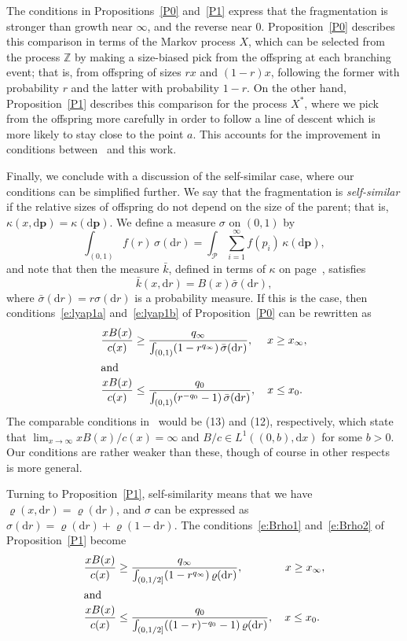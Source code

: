 \documentclass[11pt]{article}
\theoremstyle{definition}
\providecommand{\mathof}[1]{\mathrm{#1}}
\numberwithin{equation}{section}
\numberwithin{figure}{section}
\numberwithin{table}{section}
\newcommand\Pp{\mathcal{P}}
\newcommand\pp{\mathbf{p}}
\newcommand\dd{\mathof{d}}
\begin{document}
The conditions in Propositions~\ref{P0} and~\ref{P1} express that the fragmentation is stronger than growth near $\infty$, and the reverse near $0$. Proposition~\ref{P0} describes this comparison in terms of the Markov process $X$, which can be selected from the process $\mathbb{Z}$ by making a size-biased pick from the offspring at each branching event; that is, from offspring of sizes $rx$ and $(1-r)x$, following the former with probability $r$ and the latter with probability $1-r$. On the other hand, Proposition~\ref{P1} describes this comparison for the process $X^*$, where we pick from the offspring more carefully in order to follow a line of descent which is more likely to stay close to the point $a$. This accounts for the improvement in conditions between~\cite{BeFK} and this work.

Finally, we conclude with a discussion of the self-similar case, where our conditions can be simplified further. We say that the fragmentation is \emph{self-similar} if the relative sizes of offspring do not depend on the size of the parent; that is, $\kappa(x,\dd \pp) = \kappa(\dd \pp)$. We define a measure $\sigma$ on $(0,1)$ by
\[
\int_{(0,1)} f(r) \, \sigma(\dd r) = \int_{\Pp} \sum_{i=1}^\infty f(p_i) \, \kappa(\dd \pp),
\]
and note that then the measure $\bar{k}$, defined in terms of $\kappa$ on page~\pageref{s:kbar}, satisfies
\[
\bar{k}(x,\dd r) = B(x) \bar{\sigma}(\dd r),
\]
where $\bar{\sigma}(\dd r) = r\sigma(\dd r)$ is a probability measure. If this is the case, then conditions~\eqref{e:lyap1a} and~\eqref{e:lyap1b} of Proposition~\ref{P0} can be rewritten as
\begin{align}
\frac{x B(x)}{c(x)} &\ge \frac{q_\infty}{\int_{(0,1)} (1-r^{q_\infty})\, \bar{\sigma}(\dd r)},
\quad \;x \ge x_\infty,\label{e:Bc10} \\
\intertext{and}
\frac{x B(x)}{c(x)} &\le \frac{q_0}{\int_{(0,1)} (r^{-q_0}-1)\, \bar{\sigma}(\dd r)},
\quad x \le x_0.\label{e:Bc20}
\end{align}
The comparable conditions in~\cite{DoumGab} would be (13) and (12), respectively, which state that $\lim_{x\to\infty}x B(x)/c(x) = \infty$ and $B/c \in L^1((0,b), \dd x)$ for some $b>0$. Our conditions are rather weaker than these, though of course in other respects~\cite{DoumGab} is more general.

Turning to Proposition~\ref{P1}, self-similarity means that we have $\varrho(x,\dd r) = \varrho(\dd r)$, and $\sigma$ can be expressed as $\sigma(\dd r) = \varrho(\dd r) + \varrho(1-\dd r)$. The conditions~\eqref{e:Brho1} and~\eqref{e:Brho2} of Proposition~\ref{P1} become
\begin{align}
\frac{x B(x)}{c(x)} &\ge \frac{q_\infty}{\int_{(0,1/2]} (1-r^{q_\infty})\, \varrho(\dd r)},  \qquad\quad\;\;\; x\ge x_\infty,\label{e:Bc1}\\
\intertext{and}
\frac{x B(x)}{c(x)} &\le \frac{q_0}{\int_{(0,1/2]} ((1-r)^{-q_0}-1)\, \varrho(\dd r)}, \quad x\le x_0.\label{e:Bc2}
\end{align}
\end{document}
